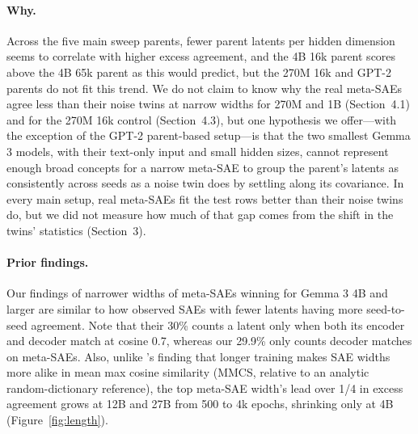 \paragraph{Why.}
Across the five main sweep parents, fewer parent latents per hidden dimension seems to correlate with higher excess agreement, and the 4B 16k parent scores above the 4B 65k parent as this would predict, but the 270M 16k and GPT-2 parents do not fit this trend.
We do not claim to know why the real meta-SAEs agree less than their noise twins at narrow widths for 270M and 1B (Section~4.1) and for the 270M 16k control (Section~4.3), but one hypothesis we offer---with the exception of the GPT-2 parent-based setup---is that the two smallest Gemma 3 models, with their text-only input and small hidden sizes, cannot represent enough broad concepts for a narrow meta-SAE to group the parent's latents as consistently across seeds as a noise twin does by settling along its covariance.
In every main setup, real meta-SAEs fit the test rows better than their noise twins do, but we did not measure how much of that gap comes from the shift in the twins' statistics (Section~3).

\paragraph{Prior findings.}
Our findings of narrower widths of meta-SAEs winning for Gemma 3 4B and larger are similar to how \citet{paulo2025sae} observed SAEs with fewer latents having more seed-to-seed agreement.
Note that their 30\% counts a latent only when both its encoder and decoder match at cosine 0.7, whereas our 29.9\% only counts decoder matches on meta-SAEs.
Also, unlike \citeauthor{liu2026timescale}'s \citeyearpar{liu2026timescale} finding that longer training makes SAE widths more alike in mean max cosine similarity (MMCS, relative to an analytic random-dictionary reference), the top meta-SAE width's lead over 1/4 in excess agreement grows at 12B and 27B from 500 to 4k epochs, shrinking only at 4B (Figure~\ref{fig:length}).
